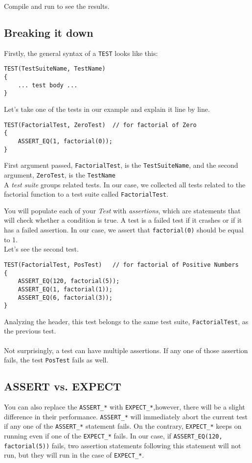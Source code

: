 Compile and run to see the results.

\newpage

\subsection{Breaking it down}

Firstly, the general syntax of a \verb!TEST! looks like this:
\begin{Verbatim}[frame=single]
TEST(TestSuiteName, TestName)
{
    ... test body ...
}
\end{Verbatim}

Let's take one of the tests in our example and explain it line by line.

\begin{Verbatim}[frame=single]
TEST(FactorialTest, ZeroTest)  // for factorial of Zero
{
    ASSERT_EQ(1, factorial(0));
} 
\end{Verbatim}

First argument passed, \verb!FactorialTest!, is the
\texttt{TestSuiteName}, and the second argument, \verb!ZeroTest!,
is the \texttt{TestName} \\ 
A \textit{test suite} groups related tests. In our case, we collected all
tests related to the factorial function to a test suite called
\verb!FactorialTest!. 

You will populate each of your \textit{Test} with \textit{assertions}, which
are statements that will check whether a condition is true. A test is a failed
test if it crashes or if it has a failed assertion. In our case, we assert that
\texttt{factorial(0)} should be equal to 1. \\

Let's see the second test.
\begin{Verbatim}[frame=single]
TEST(FactorialTest, PosTest)   // for factorial of Positive Numbers
{
    ASSERT_EQ(120, factorial(5));
    ASSERT_EQ(1, factorial(1));
    ASSERT_EQ(6, factorial(3));
}  
\end{Verbatim}
Analyzing the header, this test belongs to the same test suite, \verb!FactorialTest!, as the previous test.
\\ \\
Not surprisingly, a test can have multiple assertions. If any one of those assertion fails, the test
\verb!PosTest! fails as well. \\

\subsection{ASSERT vs. EXPECT}
You can also replace the \verb!ASSERT_*! with \verb!EXPECT_*!,however, there will be a slight difference in
their performance. \verb!ASSERT_*! will immediately abort the current test if any one of the \verb!ASSERT_*!
statement fails. On the contrary, \verb!EXPECT_*! keeps on running even if one of the \verb!EXPECT_*! fails.
In our case, if \verb!ASSERT_EQ(120, factorial(5))! fails, two assertion statements following this statement
will not run, but they will run in the case of \verb!EXPECT_*!. \newpage



